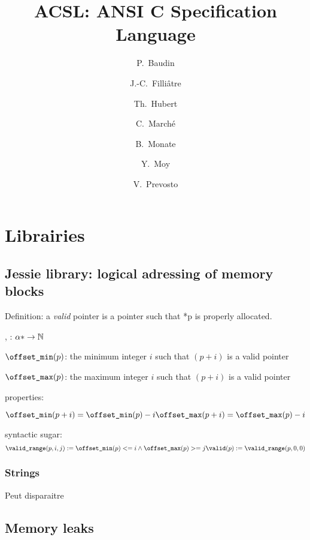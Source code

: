 \documentclass[a4paper]{report}
\begin{document}
\title{ACSL: ANSI C Specification Language}

\author{P.~Baudin \and J.-C.~Filli\^atre \and Th.~Hubert \and
  C.~March\'e \and B.~Monate \and Y.~Moy \and V.~Prevosto}

\maketitle






\chapter{Librairies}
\label{chap:lib}

\section{Jessie library: logical adressing of memory blocks}

Definition: a \emph{valid} pointer is a pointer such that *p is properly
allocated.

\offsetmin, \offsetmax : $\alpha * \rightarrow \mathbb{N}$

$\texttt{{\textbackslash}offset\_min}(p)$: the minimum integer $i$ such that $(p+i)$ is a valid
pointer

$\texttt{{\textbackslash}offset\_max}(p)$: the maximum integer $i$ such that $(p+i)$ is a valid
pointer

properties:

\[
\texttt{{\textbackslash}offset\_min}(p+i) = \texttt{{\textbackslash}offset\_min}(p)-i
\texttt{{\textbackslash}offset\_max}(p+i) = \texttt{{\textbackslash}offset\_max}(p)-i
\]

syntactic sugar:
\[
\texttt{{\textbackslash}valid\_range}(p,i,j) := \texttt{{\textbackslash}offset\_min}(p) <= i \land \texttt{{\textbackslash}offset\_max}(p) >= j
\texttt{{\textbackslash}valid}(p) := \texttt{{\textbackslash}valid\_range}(p,0,0)
\]


\subsection{Strings}

\strlen

Peut disparaitre

\section{Memory leaks}

\experimental
\end{document}
